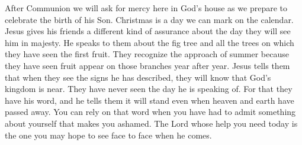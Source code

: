 After Communion we will ask for mercy here in God's house as we prepare to celebrate the birth of his Son. Christmas is a day we can mark on the calendar. Jesus gives his friends a different kind of assurance about the day they will see him in majesty. He speaks to them about the fig tree and all the trees on which they have seen the first fruit. They recognize the approach of summer because they have seen fruit appear on those branches year after year. Jesus tells them that when they see the signs he has described, they will know that God's kingdom is near. They have never seen the day he is speaking of. For that they have his word, and he tells them it will stand even when heaven and earth have passed away. You can rely on that word when you have had to admit something about yourself that makes you ashamed. The Lord whose help you need today is the one you may hope to see face to face when he comes.
